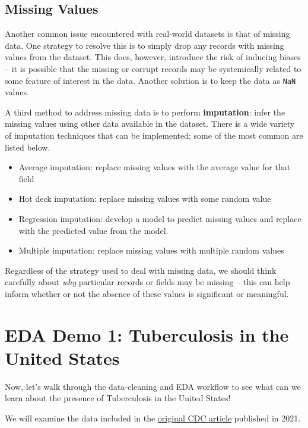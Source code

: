 \documentclass[
  letterpaper,
  DIV=11,
  numbers=noendperiod]{scrreprt}
\providecommand{\tightlist}{%
  \setlength{\itemsep}{0pt}\setlength{\parskip}{0pt}}\usepackage{longtable,booktabs,array}
\begin{document}
\subsection{Missing Values}\label{missing-values}

Another common issue encountered with real-world datasets is that of
missing data. One strategy to resolve this is to simply drop any records
with missing values from the dataset. This does, however, introduce the
risk of inducing biases -- it is possible that the missing or corrupt
records may be systemically related to some feature of interest in the
data. Another solution is to keep the data as \texttt{NaN} values.

A third method to address missing data is to perform
\textbf{imputation}: infer the missing values using other data available
in the dataset. There is a wide variety of imputation techniques that
can be implemented; some of the most common are listed below.

\begin{itemize}
\tightlist
\item
  Average imputation: replace missing values with the average value for
  that field
\item
  Hot deck imputation: replace missing values with some random value
\item
  Regression imputation: develop a model to predict missing values and
  replace with the predicted value from the model.
\item
  Multiple imputation: replace missing values with multiple random
  values
\end{itemize}

Regardless of the strategy used to deal with missing data, we should
think carefully about \emph{why} particular records or fields may be
missing -- this can help inform whether or not the absence of these
values is significant or meaningful.

\section{EDA Demo 1: Tuberculosis in the United
States}\label{eda-demo-1-tuberculosis-in-the-united-states}

Now, let's walk through the data-cleaning and EDA workflow to see what
can we learn about the presence of Tuberculosis in the United States!

We will examine the data included in the
\href{https://www.cdc.gov/mmwr/volumes/71/wr/mm7112a1.htm?s_cid=mm7112a1_w\#T1_down}{original
CDC article} published in 2021.
\end{document}
